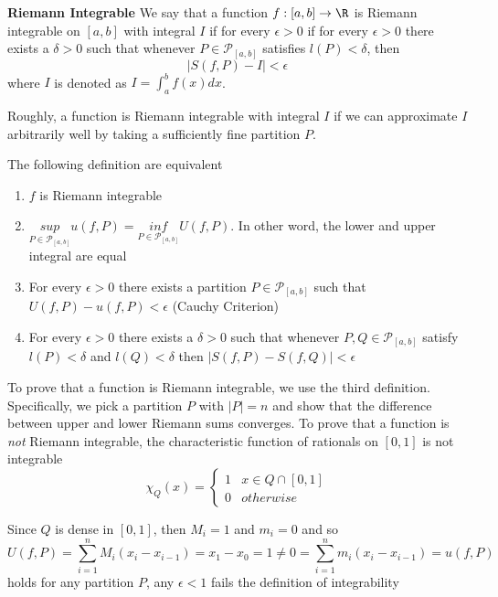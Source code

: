 \documentclass[11pt]{article}
\begin{document}
\begin{defn*}
  \textbf{Riemann Integrable} We say that a function $f: [a,b]\to \R$ is Riemann integrable on $[a,b]$ with integral $I$ if for every $\epsilon >0$ if for every $\epsilon >0$ there exists a $\delta >0$ such that whenever $P\in\mathcal{P}_{[a,b]}$ satisfies $l(P) < \delta$, then
  \[
    |S(f,P) - I| < \epsilon
  \]
  where $I$ is denoted as $I = \int_{a}^b f(x) dx$.
  \begin{rem}
    Roughly, a function is Riemann integrable with integral $I$ if we can approximate $I$ arbitrarily well by taking a sufficiently fine partition $P$.
  \end{rem}
  The following definition are equivalent
  \begin{enumerate}
    \item $f$ is Riemann integrable
    \item $\underset{P \in \mathcal{P}_{[a,b]}}{sup} u(f,P) = \underset{P \in \mathcal{P}_{[a,b]}}{inf} U(f,P)$.
    In other word, the lower and upper integral are equal
    \item For every $\epsilon>0$ there exists a partition $P\in\mathcal{P}_{[a,b]}$ such that $U(f,P) - u(f,P) < \epsilon$ (Cauchy Criterion)
    \item For every $\epsilon > 0$ there exists a $\delta >0$ such that whenever $P,Q\in \mathcal{P}_{[a,b]}$ satisfy $l(P) < \delta$ and $l(Q) < \delta$ then $|S(f,P) - S(f,Q)| < \epsilon$
  \end{enumerate}
  \begin{rem}
    To prove that a function is Riemann integrable, we use the third definition. Specifically, we pick a partition $P$ with $|P| = n$ and show that the difference between upper and lower Riemann sums converges. To prove that a function is \textit{not} Riemann integrable, the characteristic function of rationals on $[0,1]$ is not integrable
    \[
      \chi_{Q}(x) =
      \begin{cases}
        1 & x\in Q\cap [0,1]\\
        0 & otherwise
      \end{cases}
    \]
  \end{rem}
  Since $Q$ is dense in $[0,1]$, then $M_i = 1$ and $m_i = 0$ and so
  \[
    U(f,P) = \sum_{i=1}^n M_i (x_i - x_{i-1}) = x_1 - x_0 = 1 \neq 0 = \sum_{i=1}^n m_i (x_i - x_{i-1}) = u(f,P)
  \]
  holds for any partition $P$, any $\epsilon <1$ fails the definition of integrability
\end{defn*}
\end{document}
